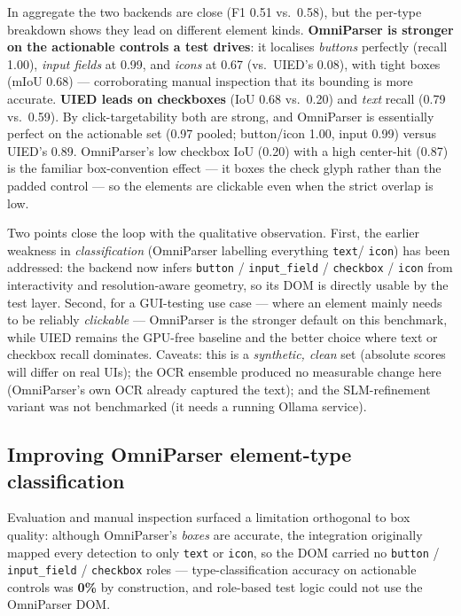 \documentclass[11pt,a4paper]{article}
\newcommand{\code}[1]{\texttt{#1}}
\begin{document}
In aggregate the two backends are close (F1 0.51 vs.\ 0.58), but the per-type
breakdown shows they lead on different element kinds. \textbf{OmniParser is stronger
on the actionable controls a test drives}: it localises \emph{buttons} perfectly
(recall 1.00), \emph{input fields} at 0.99, and \emph{icons} at 0.67 (vs.\ UIED's
0.08), with tight boxes (mIoU 0.68) --- corroborating manual inspection that its
bounding is more accurate. \textbf{UIED leads on checkboxes} (IoU 0.68 vs.\ 0.20)
and \emph{text} recall (0.79 vs.\ 0.59). By click-targetability both are strong, and
OmniParser is essentially perfect on the actionable set (0.97 pooled; button/icon
1.00, input 0.99) versus UIED's 0.89. OmniParser's low checkbox IoU (0.20) with a
high center-hit (0.87) is the familiar box-convention effect --- it boxes the check
glyph rather than the padded control --- so the elements are clickable even when the
strict overlap is low.

Two points close the loop with the qualitative observation. First, the earlier
weakness in \emph{classification} (OmniParser labelling everything \code{text}/
\code{icon}) has been addressed: the backend now infers \code{button} /
\code{input\_field} / \code{checkbox} / \code{icon} from interactivity and
resolution-aware geometry, so its DOM is directly usable by the test layer. Second,
for a GUI-testing use case --- where an element mainly needs to be reliably
\emph{clickable} --- OmniParser is the stronger default on this benchmark, while
UIED remains the GPU-free baseline and the better choice where text or checkbox
recall dominates. Caveats: this is a \emph{synthetic, clean} set (absolute scores
will differ on real UIs); the OCR ensemble produced no measurable change here
(OmniParser's own OCR already captured the text); and the SLM-refinement variant was
not benchmarked (it needs a running Ollama service).

\subsection{Improving OmniParser element-type classification}
Evaluation and manual inspection surfaced a limitation orthogonal to box quality:
although OmniParser's \emph{boxes} are accurate, the integration originally mapped
every detection to only \code{text} or \code{icon}, so the DOM carried no
\code{button} / \code{input\_field} / \code{checkbox} roles --- type-classification
accuracy on actionable controls was \textbf{0\%} by construction, and role-based
test logic could not use the OmniParser DOM.
\end{document}
